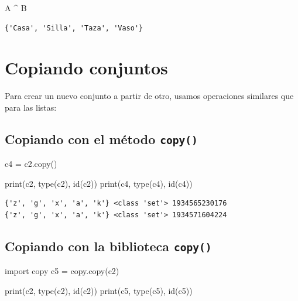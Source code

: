 \documentclass[
  spanish,
  letterpaper,
]{scrbook}
\newenvironment{Shaded}{\begin{snugshade}}{\end{snugshade}}
\newcommand{\BuiltInTok}[1]{\textcolor[rgb]{0.00,0.23,0.31}{#1}}
\newcommand{\ImportTok}[1]{\textcolor[rgb]{0.00,0.46,0.62}{#1}}
\newcommand{\NormalTok}[1]{\textcolor[rgb]{0.00,0.23,0.31}{#1}}
\newcommand{\OperatorTok}[1]{\textcolor[rgb]{0.37,0.37,0.37}{#1}}
\theoremstyle{definition}
\theoremstyle{remark}
\begin{document}
\begin{Shaded}
\begin{Highlighting}[]
\NormalTok{A }\OperatorTok{\^{}}\NormalTok{ B }
\end{Highlighting}
\end{Shaded}

\begin{verbatim}
{'Casa', 'Silla', 'Taza', 'Vaso'}
\end{verbatim}

\section{Copiando conjuntos}\label{copiando-conjuntos}

Para crear un nuevo conjunto a partir de otro, usamos operaciones
similares que para las listas:

\subsection{\texorpdfstring{Copiando con el método
\texttt{copy()}}{Copiando con el método copy()}}\label{copiando-con-el-muxe9todo-copy-1}

\begin{Shaded}
\begin{Highlighting}[]
\NormalTok{c4 }\OperatorTok{=}\NormalTok{ c2.copy()}

\BuiltInTok{print}\NormalTok{(c2, }\BuiltInTok{type}\NormalTok{(c2), }\BuiltInTok{id}\NormalTok{(c2))}
\BuiltInTok{print}\NormalTok{(c4, }\BuiltInTok{type}\NormalTok{(c4), }\BuiltInTok{id}\NormalTok{(c4))}
\end{Highlighting}
\end{Shaded}

\begin{verbatim}
{'z', 'g', 'x', 'a', 'k'} <class 'set'> 1934565230176
{'z', 'g', 'x', 'a', 'k'} <class 'set'> 1934571604224
\end{verbatim}

\subsection{\texorpdfstring{Copiando con la biblioteca
\texttt{copy()}}{Copiando con la biblioteca copy()}}\label{copiando-con-la-biblioteca-copy-1}

\begin{Shaded}
\begin{Highlighting}[]
\ImportTok{import}\NormalTok{ copy}
\NormalTok{c5 }\OperatorTok{=}\NormalTok{ copy.copy(c2)}

\BuiltInTok{print}\NormalTok{(c2, }\BuiltInTok{type}\NormalTok{(c2), }\BuiltInTok{id}\NormalTok{(c2))}
\BuiltInTok{print}\NormalTok{(c5, }\BuiltInTok{type}\NormalTok{(c5), }\BuiltInTok{id}\NormalTok{(c5))}
\end{Highlighting}
\end{Shaded}
\end{document}
